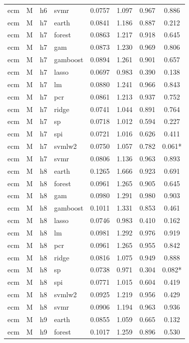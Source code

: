 \begin{ThreePartTable}
\begin{longtable}[t]{llclcccc}
ecm & M & h6 & svmr & 0.0757 & 1.097 & 0.967 & 0.886\\
\addlinespace
ecm & M & h7 & earth & 0.0841 & 1.186 & 0.887 & 0.212\\
ecm & M & h7 & forest & 0.0863 & 1.217 & 0.918 & 0.645\\
ecm & M & h7 & gam & 0.0873 & 1.230 & 0.969 & 0.806\\
ecm & M & h7 & gamboost & 0.0894 & 1.261 & 0.901 & 0.657\\
ecm & M & h7 & lasso & 0.0697 & 0.983 & 0.390 & 0.138\\
ecm & M & h7 & lm & 0.0880 & 1.241 & 0.966 & 0.843\\
ecm & M & h7 & pcr & 0.0861 & 1.213 & 0.937 & 0.752\\
ecm & M & h7 & ridge & 0.0741 & 1.044 & 0.891 & 0.764\\
ecm & M & h7 & sp & 0.0718 & 1.012 & 0.594 & 0.227\\
ecm & M & h7 & spi & 0.0721 & 1.016 & 0.626 & 0.411\\
ecm & M & h7 & svmlw2 & 0.0750 & 1.057 & 0.782 & 0.061*\\
ecm & M & h7 & svmr & 0.0806 & 1.136 & 0.963 & 0.893\\
\addlinespace
ecm & M & h8 & earth & 0.1265 & 1.666 & 0.923 & 0.691\\
ecm & M & h8 & forest & 0.0961 & 1.265 & 0.905 & 0.645\\
ecm & M & h8 & gam & 0.0980 & 1.291 & 0.980 & 0.903\\
ecm & M & h8 & gamboost & 0.1011 & 1.331 & 0.853 & 0.461\\
ecm & M & h8 & lasso & 0.0746 & 0.983 & 0.410 & 0.162\\
ecm & M & h8 & lm & 0.0981 & 1.292 & 0.976 & 0.919\\
ecm & M & h8 & pcr & 0.0961 & 1.265 & 0.955 & 0.842\\
ecm & M & h8 & ridge & 0.0816 & 1.075 & 0.949 & 0.888\\
ecm & M & h8 & sp & 0.0738 & 0.971 & 0.304 & 0.082*\\
ecm & M & h8 & spi & 0.0771 & 1.015 & 0.604 & 0.419\\
ecm & M & h8 & svmlw2 & 0.0925 & 1.219 & 0.956 & 0.429\\
ecm & M & h8 & svmr & 0.0906 & 1.194 & 0.963 & 0.936\\
\addlinespace
ecm & M & h9 & earth & 0.0855 & 1.059 & 0.665 & 0.132\\
ecm & M & h9 & forest & 0.1017 & 1.259 & 0.896 & 0.530\\

\end{longtable}
\end{ThreePartTable}
